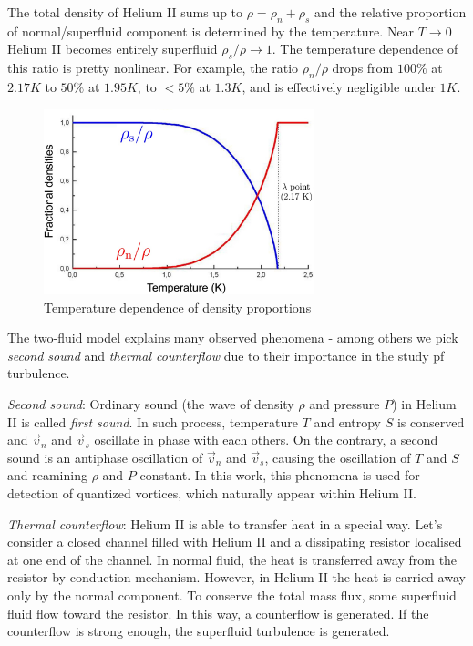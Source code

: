 	The total density of Helium II sums up to $\rho = \rho_n + \rho_s$ and the relative proportion of normal/superfluid component is determined by the temperature. Near $T \rightarrow 0$ Helium II becomes entirely superfluid $\rho_s/\rho \rightarrow 1$. The temperature dependence of this ratio is pretty nonlinear. For example, the ratio $\rho_n/\rho$ drops from $100\%$ at $2.17\unit{K}$ to $50\%$ at $1.95\unit{K}$, to $<5\%$ at $1.3\unit{K}$, and is effectively negligible under $1\unit{K}$.

	\begin{figure}[h]
		\centering
		\includegraphics[width=0.7\textwidth]{graphics/theory/densities}
		\caption{Temperature dependence of density proportions}
		\label{densities}
	\end{figure}

	The two-fluid model explains many observed phenomena - among others we pick \textit{second sound} and \textit{thermal counterflow} due to their importance in the study pf turbulence.

	\textit{Second sound}: Ordinary sound (the wave of density $\rho$ and pressure $P$) in Helium II is called \textit{first sound}. In such process, temperature $T$ and entropy $S$ is conserved and $\vec{v}_n$ and $\vec{v}_s$ oscillate in phase with each others. On the contrary, a second sound is an antiphase oscillation of $\vec{v}_n$ and $\vec{v}_s$, causing the oscillation of $T$ and $S$ and reamining $\rho$ and $P$ constant. In this work, this phenomena is used for detection of quantized vortices, which naturally appear within Helium II.

	\textit{Thermal counterflow}: Helium II is able to transfer heat in a special way. Let's consider a closed channel filled with Helium II and a dissipating resistor localised at one end of the channel. In normal fluid, the heat is transferred away from the resistor by conduction mechanism. However, in Helium II the heat is carried away only by the normal component. To conserve the total mass flux, some superfluid fluid flow toward the resistor. In this way, a counterflow is generated. If the counterflow is strong enough, the superfluid turbulence is generated.

